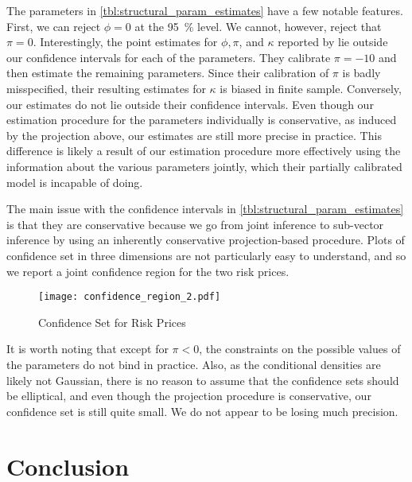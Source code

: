 \documentclass[11pt, letterpaper, twoside]{article}
\begin{document}
The parameters in \cref{tbl:structural_param_estimates} have a few notable features. First, we can reject $\phi = 0$ at the \SI{95}{\percent} level. We cannot, however, reject that $\pi = 0$. Interestingly, the point estimates for $\phi, \pi$, and $\kappa$ reported by \textcite{han2018leverage} lie outside our confidence intervals for each of the parameters. They calibrate $\pi = -10$ and then estimate the remaining parameters. Since their calibration of $\pi$ is badly misspecified, their resulting estimates for $\kappa$ is biased in finite sample.  Conversely, our estimates do not lie outside their confidence intervals. Even though our estimation procedure for the parameters individually is conservative, as induced by the projection above, our estimates are still more precise in practice. This difference is likely a result of our estimation procedure more effectively using the information about the various parameters jointly, which their partially calibrated model is incapable of doing.

The main issue with the confidence intervals in \cref{tbl:structural_param_estimates} is that they are conservative because we go from joint inference to sub-vector inference by using an inherently conservative projection-based procedure. Plots of confidence set in three dimensions are not particularly easy to understand, and so we report a joint confidence region for the two risk prices. 


\begin{figure}[htb]

  \centering
  \caption{Confidence Set for Risk Prices}
  \label{fig:confidence_region}

  \texttt{[image: confidence\_region\_2.pdf]}
\end{figure}

It is worth noting that except for $\pi < 0$, the constraints on the possible values of the parameters do not bind in practice. Also, as the conditional densities are likely not Gaussian, there is no reason to assume that the confidence sets should be elliptical, and even though the projection procedure is conservative, our confidence set is still quite small. We do not appear to be losing much precision.


\section{Conclusion}\label{sec:conclusion}
\end{document}
